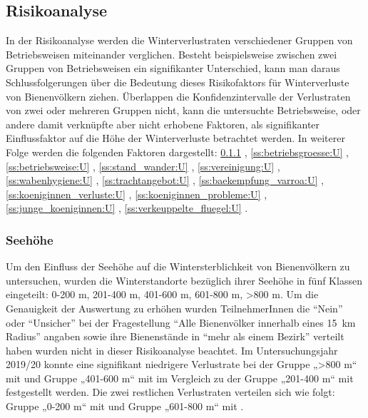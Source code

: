 \subsection{Risikoanalyse}

In der Risikoanalyse werden die Winterverlustraten verschiedener Gruppen von Betriebsweisen miteinander verglichen. Besteht beispielsweise zwischen zwei Gruppen von Betriebsweisen ein signifikanter Unterschied, kann man daraus Schlussfolgerungen über die Bedeutung dieses Risikofaktors für Winterverluste von Bienenvölkern ziehen. Überlappen die Konfidenzintervalle der Verlustraten von zwei oder mehreren Gruppen nicht, kann die untersuchte Betriebsweise, oder andere damit verknüpfte aber nicht erhobene Faktoren, als signifikanter Einflussfaktor auf die Höhe der Winterverluste betrachtet werden. In weiterer Folge werden die folgenden Faktoren dargestellt:
\ref{ss:seehoehe:U} ,
\ref{ss:betriebsgroesse:U} ,
\ref{ss:betriebsweise:U} ,
\ref{ss:stand_wander:U} ,
\ref{ss:vereinigung:U} ,
\ref{ss:wabenhygiene:U} ,
\ref{ss:trachtangebot:U} ,
\ref{ss:baekempfung_varroa:U} ,
\ref{ss:koeniginnen_verluste:U} ,
\ref{ss:koeniginnen_probleme:U} ,
\ref{ss:junge_koeniginnen:U} ,
\ref{ss:verkeuppelte_fluegel:U} .


\subsubsection{Seehöhe}
\label{ss:seehoehe:U}

Um den Einfluss der Seehöhe auf die Wintersterblichkeit von Bienenvölkern zu untersuchen, wurden die Winterstandorte bezüglich ihrer Seehöhe in fünf Klassen eingeteilt: 0-200 m, 201-400 m, 401-600 m, 601-800 m, >800 m. Um die Genauigkeit der Auswertung zu erhöhen wurden TeilnehmerInnen die \enquote{Nein} oder \enquote{Unsicher} bei der Fragestellung \enquote{Alle Bienenvölker innerhalb eines \SI{15}{\kilo\meter} Radius} angaben sowie ihre Bienenstände in \enquote{mehr als einem Bezirk} verteilt haben wurden nicht in dieser Risikoanalyse beachtet.
\newline
Im Untersuchungsjahr 2019/20 konnte eine signifikant niedrigere Verlustrate bei der Gruppe „>800 m`` mit 
und Gruppe „401-600 m`` mit  im Vergleich zu der Gruppe „201-400 m`` mit 
festgestellt werden.
\newline
Die zwei restlichen Verlustraten verteilen sich wie folgt: Gruppe „0-200 m`` mit  und Gruppe „601-800 m`` mit .

